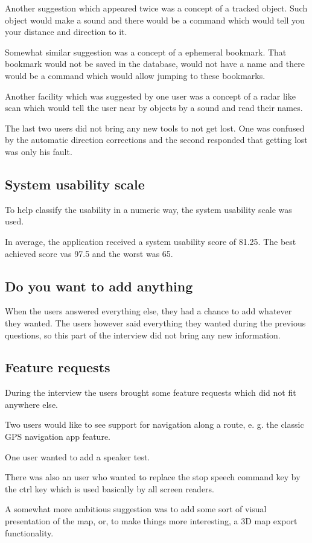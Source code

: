 \documentclass[nolof,digital]{fithesis3}
\begin{document}
Another suggestion which appeared twice was a concept of a tracked object. Such object would make a sound and there would be a command which would tell you your distance and direction to it.

Somewhat similar suggestion was a concept of a ephemeral bookmark. That bookmark would not be saved in the database, would not have a name and there would be a command which would allow jumping to these bookmarks.

Another facility which was suggested by one user was a concept of a radar like scan which would tell the user near by objects by a sound and read their names.

The last two users did not bring any new tools to not get lost. One was confused by the automatic direction corrections and the second responded that getting lost was only his fault.
\subsection{System usability scale}
To help classify the usability in a numeric way, the system usability scale was used.

In average, the application received a system usability score of 81.25. The best achieved score vas 97.5 and the worst was 65.

\subsection{Do you want to add anything}
When the users answered everything else, they had a chance to add whatever they wanted. The users however said everything they wanted during the previous questions, so this part of the interview did not bring any new information.
\subsection{Feature requests}
During the interview the users brought some feature requests which did not fit anywhere else.

Two users would like to see support for navigation along a route, e. g. the classic GPS navigation app feature.

One user wanted to add a speaker test.

There was also an user who wanted to replace the stop speech command key by the ctrl key which is used basically by all screen readers.

 A somewhat more ambitious suggestion was to add some sort of visual presentation of the map, or, to make things more interesting, a 3D map export functionality.
\end{document}
